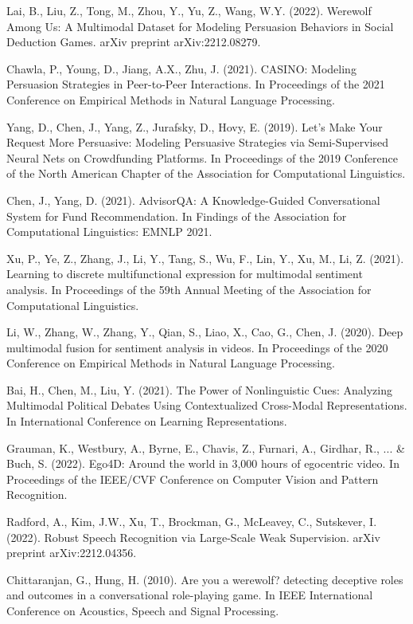 \documentclass{article}
\begin{document}
\begin{thebibliography}{10}

Lai, B., Liu, Z., Tong, M., Zhou, Y., Yu, Z., Wang, W.Y. (2022). Werewolf Among Us: A Multimodal Dataset for Modeling Persuasion Behaviors in Social Deduction Games. arXiv preprint arXiv:2212.08279.

Chawla, P., Young, D., Jiang, A.X., Zhu, J. (2021). CASINO: Modeling Persuasion Strategies in Peer-to-Peer Interactions. In Proceedings of the 2021 Conference on Empirical Methods in Natural Language Processing.

Yang, D., Chen, J., Yang, Z., Jurafsky, D., Hovy, E. (2019). Let's Make Your Request More Persuasive: Modeling Persuasive Strategies via Semi-Supervised Neural Nets on Crowdfunding Platforms. In Proceedings of the 2019 Conference of the North American Chapter of the Association for Computational Linguistics.

Chen, J., Yang, D. (2021). AdvisorQA: A Knowledge-Guided Conversational System for Fund Recommendation. In Findings of the Association for Computational Linguistics: EMNLP 2021.

Xu, P., Ye, Z., Zhang, J., Li, Y., Tang, S., Wu, F., Lin, Y., Xu, M., Li, Z. (2021). Learning to discrete multifunctional expression for multimodal sentiment analysis. In Proceedings of the 59th Annual Meeting of the Association for Computational Linguistics.

Li, W., Zhang, W., Zhang, Y., Qian, S., Liao, X., Cao, G., Chen, J. (2020). Deep multimodal fusion for sentiment analysis in videos. In Proceedings of the 2020 Conference on Empirical Methods in Natural Language Processing.

Bai, H., Chen, M., Liu, Y. (2021). The Power of Nonlinguistic Cues: Analyzing Multimodal Political Debates Using Contextualized Cross-Modal Representations. In International Conference on Learning Representations.

Grauman, K., Westbury, A., Byrne, E., Chavis, Z., Furnari, A., Girdhar, R., ... \& Buch, S. (2022). Ego4D: Around the world in 3,000 hours of egocentric video. In Proceedings of the IEEE/CVF Conference on Computer Vision and Pattern Recognition.

Radford, A., Kim, J.W., Xu, T., Brockman, G., McLeavey, C., Sutskever, I. (2022). Robust Speech Recognition via Large-Scale Weak Supervision. arXiv preprint arXiv:2212.04356.

Chittaranjan, G., Hung, H. (2010). Are you a werewolf? detecting deceptive roles and outcomes in a conversational role-playing game. In IEEE International Conference on Acoustics, Speech and Signal Processing.

\end{thebibliography}
\end{document}
